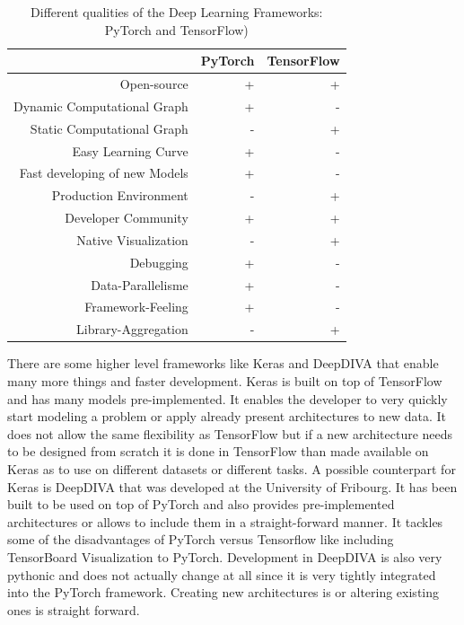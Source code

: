 \begin{table}[t] \centering
{}
\caption{Different qualities of the Deep Learning Frameworks: PyTorch and TensorFlow)}
\begin{tabular}{@{}rrr@{}}
\toprule & PyTorch & TensorFlow \\
\midrule
Open-source									& + & + \\
Dynamic Computational Graph			& + & -  \\
Static Computational Graph				& - & +  \\
Easy Learning Curve							& + & -  \\
Fast developing of new Models			& + & -  \\
Production Environment					& - & + \\
Developer Community						& + & + \\
Native Visualization							& - & +  \\
Debugging										& + & -  \\
Data-Parallelisme								& + & -  \\
Framework-Feeling							& + & -  \\
Library-Aggregation							& - & +  \\

\bottomrule
\end{tabular}
\label{tbl:DeepLearningFrameworks}
\end{table}

There are some higher level frameworks like Keras \cite{keras} and DeepDIVA \cite{deepdiva} that enable many more things and faster development. Keras is built on top of TensorFlow and has many models pre-implemented. It enables the developer to very quickly start modeling a problem or apply already present architectures to new data. It does not allow the same flexibility as TensorFlow but if a new architecture needs to be designed from scratch it is done in TensorFlow than made available on Keras as to use on different datasets or different tasks. A possible counterpart for Keras is DeepDIVA that was developed at the University of Fribourg. It has been built to be used on top of PyTorch and also provides pre-implemented architectures or allows to include them in a straight-forward manner. It tackles some of the disadvantages of PyTorch versus Tensorflow like including TensorBoard Visualization to PyTorch. Development in DeepDIVA is also very pythonic and does not actually change at all since it is very tightly integrated into the PyTorch framework. Creating new architectures is or altering existing ones is straight forward.

